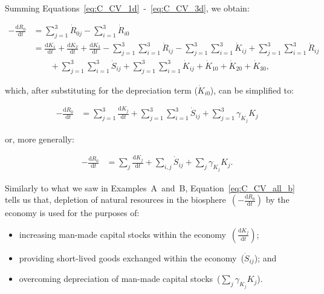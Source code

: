 Summing Equations~\ref{eq:C_CV_1d}~-~\ref{eq:C_CV_3d},
we obtain:

\begin{align}\label{eq:C_CV_all}
	- \frac{\mathrm{d}R_{0}}{\mathrm{d}t}										&
	= \sum_{j = 1}^{3}\dot{R}_{0j}
	- \sum_{i = 1}^{3}\dot{R}_{i0}									\nonumber	\\
	& =\frac{\mathrm{d}K_{1}}{\mathrm{d}t}
	+ \frac{\mathrm{d}K_{2}}{\mathrm{d}t}
	+ \frac{\mathrm{d}K_{3}}{\mathrm{d}t}
	- \sum_{j = 1}^{3}\sum_{i = 1}^{3}\dot{R}_{ij}
	- \sum_{j = 1}^{3}\sum_{i = 1}^{3}\dot{K}_{ij}
	+ \sum_{j = 1}^{3}\sum_{i = 1}^{3}\dot{R}_{ij}		\nonumber	\\
	& \qquad {} + \sum_{j = 1}^{3}\sum_{i = 1}^{3}\dot{S}_{ij}
	+ \sum_{j = 1}^{3}\sum_{i = 1}^{3}\dot{K}_{ij}
	+ \dot{K}_{10}
	+ \dot{K}_{20}
	+ \dot{K}_{30},
\end{align}

\noindent{}which,
after substituting for 
the depreciation term ($\dot{K}_{i0}$),
can be simplified to:

\begin{align}\label{eq:C_CV_all_a}
	- \frac{\mathrm{d}R_{0}}{\mathrm{d}t}										&
	=\sum_{j = 1}^{3}\frac{\mathrm{d}K_{j}}{\mathrm{d}t}
	+ \sum_{j = 1}^{3}\sum_{i = 1}^{3}\dot{S}_{ij}
	+ \sum_{j = 1}^{3}\gamma_{K_{j}}K_{j}
\end{align}

\noindent{}or,
more generally:

\begin{align}\label{eq:C_CV_all_b}
	- \frac{\mathrm{d}R_{0}}{\mathrm{d}t}										&
	=\sum_{j}\frac{\mathrm{d}K_{j}}{\mathrm{d}t}
	+ \sum_{i,j}\dot{S}_{ij}
	+ \sum_{j}\gamma_{K_{j}}K_{j}.
\end{align}

Similarly to what we saw in Examples~A~and~B,
Equation~\ref{eq:C_CV_all_b} tells us that,
depletion of natural resources in the 
biosphere~$\left(- \frac{\mathrm{d}R_{0}}{\mathrm{d}t}\right)$
by the economy
is used for the purposes of:

\begin{itemize}
	\item increasing man-made capital stocks
	within the economy~$\left(\frac{\mathrm{d}K_{j}}{\mathrm{d}t}\right)$;
	\item providing short-lived goods exchanged within the
	economy~($\dot{S}_{ij}$); and
	\item overcoming depreciation of man-made
	capital stocks~($\sum_{j}\gamma_{K_{j}}K_{j}$).
\end{itemize}

